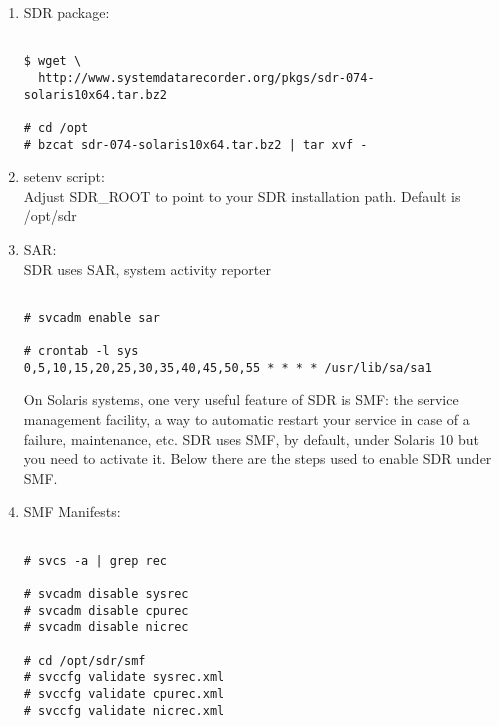 \begin{enumerate}

\item SDR package:

\begin{Verbatim}[fontsize=\relsize{-2},frame=single,
                 label=\fbox{Installation procedure},
                 framesep=3mm,labelposition=bottomline]

$ wget \
  http://www.systemdatarecorder.org/pkgs/sdr-074-solaris10x64.tar.bz2

# cd /opt
# bzcat sdr-074-solaris10x64.tar.bz2 | tar xvf -

\end{Verbatim}

\item setenv script:\\
Adjust SDR\_ROOT to point to your SDR installation
path. Default is /opt/sdr

\item SAR:\\
SDR uses SAR, system activity reporter

\begin{Verbatim}[fontsize=\relsize{-2},frame=single,
                 label=\fbox{SAR},
                 framesep=3mm,labelposition=bottomline]

# svcadm enable sar

# crontab -l sys
0,5,10,15,20,25,30,35,40,45,50,55 * * * * /usr/lib/sa/sa1 

\end{Verbatim}


\noindent
On Solaris systems, one very useful feature of SDR is SMF: 
the service management facility, a way to automatic restart 
your service in case of a failure, maintenance, etc. SDR 
uses SMF, by default, under Solaris 10 but you need to
activate it. Below there are the steps used to enable SDR under SMF.

\item SMF Manifests:

\begin{Verbatim}[fontsize=\relsize{-2},frame=single,
                 label=\fbox{SMF Manifests},
                 framesep=3mm,labelposition=bottomline]

# svcs -a | grep rec

# svcadm disable sysrec
# svcadm disable cpurec
# svcadm disable nicrec

# cd /opt/sdr/smf
# svccfg validate sysrec.xml 
# svccfg validate cpurec.xml                       
# svccfg validate nicrec.xml                       


\end{Verbatim}
\end{enumerate}
